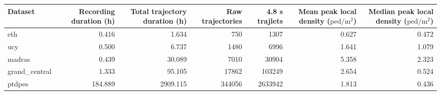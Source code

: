 \begin{tabular}{lrrrrrr}
Dataset & Recording duration (h) & Total trajectory duration (h) & Raw trajectories & 4.8 s trajlets & Mean peak local density ($\mathrm{ped}/\mathrm{m}^2$) & Median peak local density ($\mathrm{ped}/\mathrm{m}^2$) \\
\hline
eth & 0.416 & 1.634 & 750 & 1307 & 0.627 & 0.472 \\
ucy & 0.500 & 6.737 & 1480 & 6996 & 1.641 & 1.079 \\
madras & 0.439 & 30.089 & 7010 & 30904 & 5.358 & 2.323 \\
grand_central & 1.333 & 95.105 & 17862 & 103249 & 2.654 & 0.524 \\
ptdpes & 184.889 & 2909.115 & 344056 & 2633942 & 1.813 & 0.436 \\
\end{tabular}
